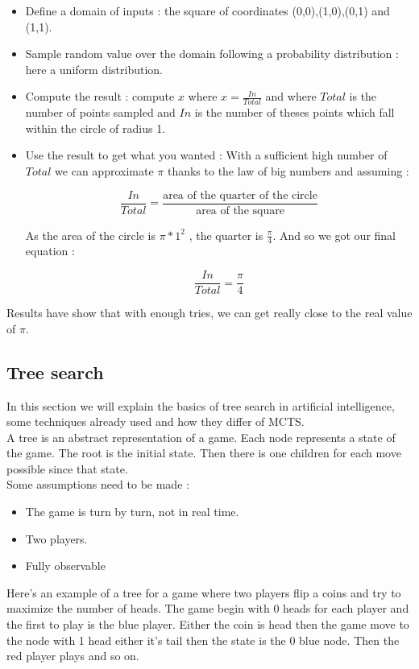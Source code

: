 \begin{itemize}
\item Define a domain of inputs : the square of coordinates (0,0),(1,0),(0,1) and (1,1).
\item Sample random value over the domain following a probability distribution : here a uniform distribution. 
\item Compute the result : compute $x$ where $x = \frac{In}{Total}$ and where $Total$ is the number of points sampled and $In$ is the number of theses points which fall within the circle of radius 1. 
\item Use the result to get what you wanted : With a sufficient high number of $Total$ we can approximate $\pi$ thanks to the law of big numbers and assuming : 


$$\frac{In}{Total}= \frac{\textrm{area of the quarter of the circle}}{\textrm{area of the square}}$$

 As the area of the circle is $ \pi*1^2$ , the quarter is $\frac{\pi}{4}$. And so we got our final equation : 

$$
\frac{In}{Total}=\frac{\pi}{4}
$$
\end{itemize} 

Results have show that with enough tries, we can get really close to the real value of $\pi$. 

\subsection{Tree search}
In this section we will explain the basics of tree search in artificial intelligence, some techniques already used and how they differ of MCTS. 
\\

A tree is an abstract representation of a game. Each node represents a state of the game. The root is the initial state. Then there is one children for each move possible since that state. 
\\

Some assumptions need to be made : 
\begin{itemize}
\item The game is turn by turn, not in real time. 
\item Two players.
\item Fully observable

\end{itemize}

Here's an example of a tree for a game where two players flip a coins and try to maximize the number of heads. The game begin with 0 heads for each player and the first to play is the blue player. Either the coin is head then the game move to the node with 1 head either it's tail then the state is the 0 blue node. Then the red player plays and so on. 
\begin{center}
\end{center}
